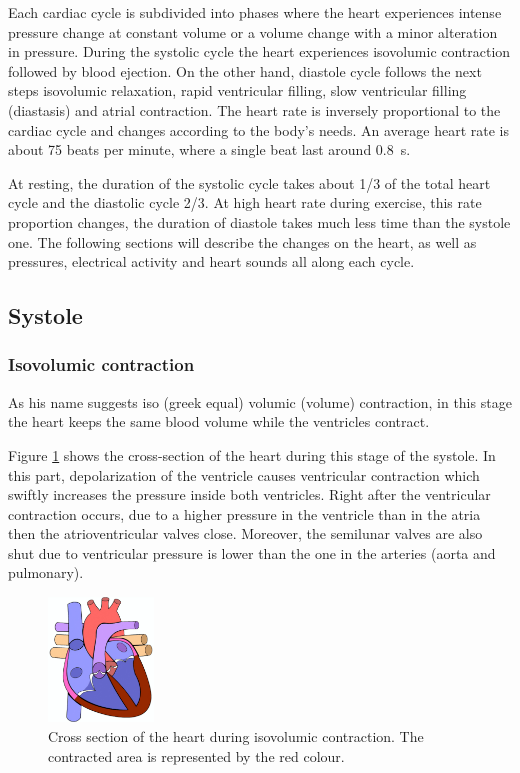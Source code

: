 Each cardiac cycle is subdivided into phases where the heart experiences intense pressure change at constant volume or a volume change with a minor alteration in pressure. During the systolic cycle the heart experiences isovolumic contraction followed by blood ejection. On the other hand, diastole cycle follows the next steps isovolumic relaxation, rapid ventricular filling, slow ventricular filling (diastasis) and atrial contraction. The heart rate is inversely proportional to the cardiac cycle and changes according to the body's needs. An average heart rate is about 75 beats per minute, where a single beat last around \SI{0.8}{\second}.

At resting, the duration of the systolic cycle takes about 1/3 of the total heart cycle and the diastolic cycle 2/3. At high heart rate during exercise, this rate proportion changes, the duration of diastole takes much less time than the systole one. The following sections will describe the changes on the heart, as well as pressures, electrical activity and heart sounds all along each cycle.

\subsection{Systole}
\subsubsection{Isovolumic contraction}
As his name suggests iso (greek equal) volumic (volume) contraction, in this stage the heart keeps the same blood volume while the ventricles contract.

Figure \ref{fig:heart isovolumic} shows the cross-section of the heart during this stage of the systole. In this part, depolarization of the ventricle causes ventricular contraction which swiftly increases the pressure inside both ventricles. Right after the ventricular contraction occurs, due to a higher pressure in the ventricle than in the atria then the atrioventricular valves close. Moreover, the semilunar valves are also shut due to ventricular pressure is lower than the one in the arteries (aorta and pulmonary).

\begin{figure}[!htpb]
	\centering
	\includegraphics[width=0.25\textwidth,keepaspectratio]{figure_3}    
	\caption[Isovolumic contraction]{Cross section of the heart during isovolumic contraction. The contracted area is represented by the red colour.}
	\label{fig:heart isovolumic}
\end{figure}

